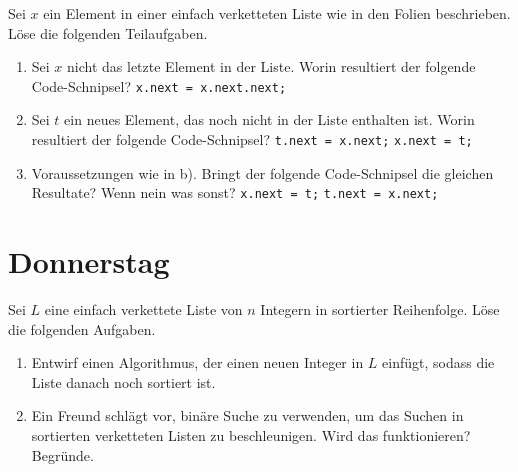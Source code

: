 \documentclass{uebung_cs}
\begin{document}
\begin{aufgabe}
	Sei $x$ ein Element in einer einfach verketteten Liste wie in den Folien beschrieben.
	Löse die folgenden Teilaufgaben.
	\begin{enumerate}
		\item Sei $x$ nicht das letzte Element in der Liste.
		Worin resultiert der folgende Code-Schnipsel?
		\hspace*{20pt}\texttt{x.next = x.next.next;}

		\item Sei $t$ ein neues Element, das noch nicht in der Liste enthalten ist.
		Worin resultiert der folgende Code-Schnipsel?
		\hspace*{20pt}\texttt{t.next = x.next;}
		\hspace*{20pt}\texttt{x.next = t;}

		\item Voraussetzungen wie in b).
		Bringt der folgende Code-Schnipsel die gleichen Resultate?
		Wenn nein was sonst?
		\hspace*{20pt}\texttt{x.next = t;}
		\hspace*{20pt}\texttt{t.next = x.next;}
	\end{enumerate}
\end{aufgabe}


\section*{Donnerstag}

\begin{aufgabe}
	Sei $L$ eine einfach verkettete Liste von $n$ Integern in sortierter Reihenfolge.
	Löse die folgenden Aufgaben.
	\begin{enumerate}
		\item Entwirf einen Algorithmus, der einen neuen Integer in $L$ einfügt, sodass die Liste danach noch sortiert ist.
		\item Ein Freund schlägt vor, binäre Suche zu verwenden, um das Suchen in sortierten verketteten Listen zu beschleunigen. Wird das funktionieren? Begründe.
	\end{enumerate}
\end{aufgabe}
\end{document}
